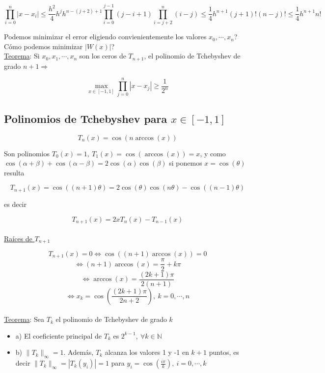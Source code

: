 $$\prod \limits_{i = 0}^{n} |x - x_{i}| \leq \frac{h^{2}}{4} h^{j} h^{n - (j + 2) + 1} \prod \limits_{i = 0}^{j - 1} (j - i + 1)\prod \limits_{i = j + 2}^{n} (i - j) \leq \frac{1}{4}h^{n + 1}(j + 1)!(n - j)! \leq \frac{1}{4}h^{n + 1}n!$$

Podemos minimizar el error eligiendo convienientemente los valores $x_{0}, \cdots, x_{n}$? C\'omo podemos minimizar $|W(x)|$?\\

\underline{Teorema}: Si $x_{0}, x_{1}, \cdots, x_{n}$ son los ceros de $T_{n + 1}$, el polinomio de Tchebyshev de grado $n + 1 \Rightarrow$

$$\max \limits_{x \in [-1, 1]} \prod \limits_{j = 0}^{n} |x - x_{j}| \geq \frac{1}{2^{n}}$$

\subsection{Polinomios de Tchebyshev para $x \in [-1, 1]$}

$$T_{n}(x) = \cos(n \arccos(x))$$

Son polinomios $T_{0}(x) = 1,\ T_{1}(x) = \cos(\arccos(x)) = x$, y como $\cos(\alpha + \beta) + \cos(\alpha - \beta) = 2\cos(\alpha)\cos(\beta)$ si ponemos $x = \cos(\theta)$ resulta

$$T_{n + 1}(x) = \cos((n + 1)\theta) = 2\cos(\theta)\cos(n\theta) - \cos((n - 1)\theta)$$

es decir

$$T_{n + 1}(x) = 2xT_{n}(x) - T_{n - 1}(x)$$\\

\underline{Ra\'ices de $T_{n + 1}$}

$$T_{n + 1}(x) = 0 \iff \cos((n + 1)\arccos(x)) = 0$$
$$\iff (n + 1)\arccos(x) = \frac{\pi}{2} + k\pi$$
$$\iff \arccos(x) = \frac{(2k + 1)\pi}{2(n + 1)}$$
$$\iff x_{k} = \cos(\frac{(2k + 1)\pi}{2n + 2}),\ k = 0, \cdots, n$$\\

\underline{Teorema}: Sea $T_{k}$ el polinomio de Tchebyshev de grado $k$

\begin{itemize}
	\item a) El coeficiente principal de $T_{k}$ es $2^{k - 1},\ \forall k \in \mathbb{N}$
	\item b) $\|T_{k}\|_{\infty} = 1$. Adem\'as, $T_{k}$ alcanza los valores 1 y -1 en $k + 1$ puntos, es decir $\|T_{k}\|_{\infty} = |T_{k}(y_{i})| = 1$ para $y_{i} = \cos(\frac{i\pi}{k}),\ i = 0, \cdots, k$\\
\end{itemize}


